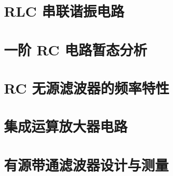 \documentclass[12pt, oneside, openany]{ctexbook}
\begin{document}
\graphicspath{{./4. RC/figures/}{./requirements/extracted_images/word/media/}{./}}
\chapter{RLC 串联谐振电路}


\graphicspath{{./5. RC2/figures/}{./requirements/extracted_images/word/media/}{./}}
\chapter{一阶 RC 电路暂态分析}


\graphicspath{{./6. function/figures/}{./requirements/extracted_images/word/media/}{./}}
\chapter{RC 无源滤波器的频率特性}


\graphicspath{{./7. amp/figures/}{./}}
\chapter{集成运算放大器电路}


\graphicspath{{./8. final/figures/}{./}}
\chapter{有源带通滤波器设计与测量}

\end{document}
